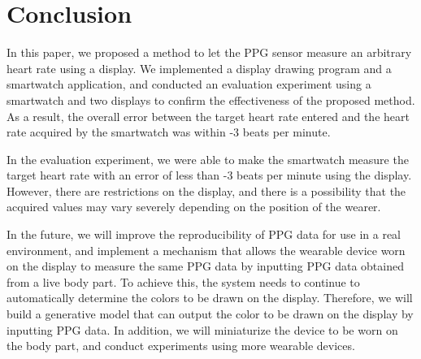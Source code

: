 \documentclass[sigchi,authordraft]{acmart}
\begin{document}





\section{Conclusion}
\label{sec:conclusion}
In this paper, we proposed a method to let the PPG sensor measure an arbitrary heart rate using a display. We implemented a display drawing program and a smartwatch application, and conducted an evaluation experiment using a smartwatch and two displays to confirm the effectiveness of the proposed method. As a result, the overall error between the target heart rate entered and the heart rate acquired by the smartwatch was within -3 beats per minute.
\par

In the evaluation experiment, we were able to make the smartwatch measure the target heart rate with an error of less than -3 beats per minute using the display. However, there are restrictions on the display, and there is a possibility that the acquired values may vary severely depending on the position of the wearer.\par

In the future, we will improve the reproducibility of PPG data for use in a real environment, and implement a mechanism that allows the wearable device worn on the display to measure the same PPG data by inputting PPG data obtained from a live body part. To achieve this, the system needs to continue to automatically determine the colors to be drawn on the display. Therefore, we will build a generative model that can output the color to be drawn on the display by inputting PPG data. In addition, we will miniaturize the device to be worn on the body part, and conduct experiments using more wearable devices.
\end{document}
